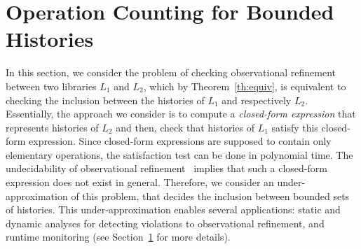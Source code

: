 \section{Operation Counting for Bounded Histories}


In this section, we consider the problem of checking observational refinement between two libraries $L_1$ and $L_2$, 
which by Theorem~\ref{th:equiv}, is equivalent to checking the inclusion between the histories of $L_1$ and respectively $L_2$.
Essentially, the approach we consider is to compute a \emph{closed-form expression} that represents histories of $L_2$
and then, check that histories of $L_1$ satisfy this closed-form expression. 
Since closed-form expressions are supposed to contain only elementary operations, the satisfaction test can be done in 
polynomial time.
The undecidability of observational 
refinement~\cite{conf/esop/BouajjaniEEH13} implies that such a closed-form expression does not exist in general.
Therefore, we consider an under-approximation of this problem, that decides the inclusion between bounded
sets of histories. This under-approximation enables several applications: static and dynamic analyses for
detecting violations to observational refinement, and runtime monitoring (see Section~\ref{} for more details).

%


